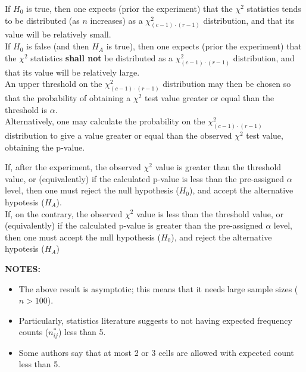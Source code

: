 \begin{frame}
  \vspace{0.25cm}
  If $H_0$ is true, then one expects (prior the experiment) that the $\chi^2$ statistics tends to be distributed (as $n$ increases) as a $\chi_{(c-1)\cdot(r-1)}^2$ distribution, and that its value will be relatively small.\\
  \vspace{0.25cm}
  If $H_0$ is false (and then $H_A$ is true), then one expects (prior the experiment) that the $\chi^2$ statistics \textbf{shall not} be distributed as a $\chi_{(c-1)\cdot(r-1)}^2$ distribution, and that its value will be relatively large.\\
  \vspace{0.25cm}
  An upper threshold on the $\chi_{(c-1)\cdot(r-1)}^2$ distribution may then be chosen so that the probability of obtaining a $\chi^2$ test value greater or equal than the threshold is $\alpha$.\\
  \vspace{0.25cm}
  Alternatively, one may calculate the probability on the $\chi_{(c-1)\cdot(r-1)}^2$ distribution to give a value greater or equal than the observed  $\chi^2$ test value, obtaining the p-value.
\end{frame}

\begin{frame}
  \vspace{0.75cm}
  If, after the experiment, the observed $\chi^2$ value is greater than the threshold value, or (equivalently) if the calculated p-value is less than the pre-assigned $\alpha$ level, then one must reject the null hypothesis ($H_0$), and accept the alternative hypotesis ($H_A$).\\
  \vspace{1cm}
  If, on the contrary, the observed $\chi^2$ value is less than the threshold value, or (equivalently) if the calculated p-value is greater than the pre-assigned $\alpha$ level, then one must accept the null hypothesis ($H_0$), and reject the alternative hypotesis ($H_A$)
\end{frame}


\begin{frame}
    \textbf{NOTES:}
    \begin{itemize}
      \vspace{0.5cm}
      \item The above result is asymptotic; this means that it needs large sample sizes ($ n>100 $).
      \vspace{0.5cm}
      \item Particularly, statistics literature suggests to not having expected frequency counts ($ n_{ij}^* $) less than 5.\\
      \vspace{0.5cm}
      \item Some authors say that at most 2 or 3 cells are allowed with expected count less than 5.
    \end{itemize}
\end{frame}

